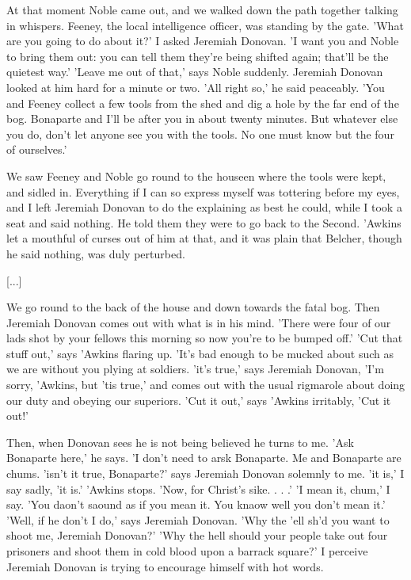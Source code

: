 \documentclass[10pt,a4paper]{article}
\begin{document}
At that moment Noble came out, and we walked down the path together talking in whispers. Feeney, the local intelligence officer, was standing by the gate. 'What are you going to do about it?' I asked Jeremiah Donovan. 'I want you and Noble to bring them out: you can tell them they're being shifted again; that'll be the quietest way.' 'Leave me out of that,' says Noble suddenly. Jeremiah Donovan looked at him hard for a minute or two. 'All right so,' he said peaceably. 'You and Feeney collect a few tools from the shed and dig a hole by the far end of the bog. Bonaparte and I'll be after you in about twenty minutes. But whatever else you do, don't let anyone see you with the tools. No one must know but the four of ourselves.' 

We saw Feeney and Noble go round to the houseen where the tools were kept, and sidled in. Everything if I can so express myself was tottering before my eyes, and I left Jeremiah Donovan to do the explaining as best he could, while I took a seat and said nothing. He told them they were to go back to the Second. 'Awkins let a mouthful of curses out of him at that, and it was plain that Belcher, though he said nothing, was duly perturbed. 

[...]

We go round to the back of the house and down towards the fatal bog. Then Jeremiah Donovan comes out with what is in his mind. 'There were four of our lads shot by your fellows this morning so now you're to be bumped off.' 'Cut that stuff out,' says 'Awkins flaring up. 'It's bad enough to be mucked about such as we are without you plying at soldiers. 'it's true,' says Jeremiah Donovan, 'I'm sorry, 'Awkins, but 'tis true,' and comes out with the usual rigmarole about doing our duty and obeying our superiors. 'Cut it out,' says 'Awkins irritably, 'Cut it out!' 

Then, when Donovan sees he is not being believed he turns to me. 'Ask Bonaparte here,' he says. 'I don't need to arsk Bonaparte. Me and Bonaparte are chums. 'isn't it true, Bonaparte?' says Jeremiah Donovan solemnly to me. 'it is,' I say sadly, 'it is.' 'Awkins stops. 'Now, for Christ's sike. . . .' 'I mean it, chum,' I say. 'You daon't saound as if you mean it. You knaow well you don't mean it.' 'Well, if he don't I do,' says Jeremiah Donovan. 'Why the 'ell sh'd you want to shoot me, Jeremiah Donovan?' 'Why the hell should your people take out four prisoners and shoot them in cold blood upon a barrack square?' I perceive Jeremiah Donovan is trying to encourage himself with hot words. 
\end{document}
